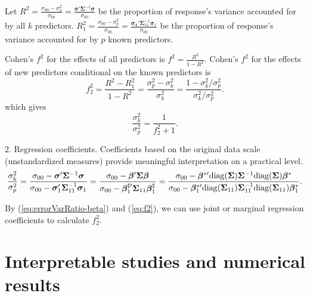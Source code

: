 \documentclass[11pt]{article}
\begin{document}
Let $R^2 = \frac{\sigma_{00}-\sigma^2_k}{\sigma_{00}} = \frac{\boldsymbol{\sigma}' \boldsymbol{\Sigma}^{-1} \boldsymbol{\sigma}}{\sigma_{00}}$ be the proportion of response's variance accounted for by all $k$ predictors. $R_1^2 = \frac{\sigma_{00}-\sigma^2_p}{\sigma_{00}} = \frac{\boldsymbol{\sigma_1}' \boldsymbol{\Sigma}_{11}^{-1} \boldsymbol{\sigma}_1}{\sigma_{00}}$ be the proportion of response's variance accounted for by $p$ known predictors.

Cohen's $f^2$ for the effects of all predictors is $f^2 = \frac{R^2}{1-R^2}$. Cohen's $f^2$ for the effects of new predictors conditional on the known predictors is 
\begin{equation}
\label{eq:f2}
f_2^2 = \frac{R^2 - R_1^2}{1- R^2} = \frac{\sigma_p^2 - \sigma_k^2}{\sigma_k^2} = \frac{1 - \sigma_k^2/\sigma_p^2}{\sigma_k^2/\sigma_p^2}.
\end{equation}
which gives 
\begin{equation}
\label{eq:errorVarRatio-f2}
\frac{\sigma_k^2}{\sigma_p^2}=\frac{1}{f_2^2 + 1}.
\end{equation}

2. Regression coefficients. Coefficients based on the original data scale (unstandardized measures) provide meaningful interpretation on a practical level. 
\begin{equation}
\label{eq:errorVarRatio-beta}
\frac{\sigma_k^2}{\sigma_p^2}
=\frac{\sigma_{00} - \boldsymbol{\sigma}' \boldsymbol{\Sigma}^{-1} \boldsymbol{\sigma}}{\sigma_{00} - \boldsymbol{\sigma}_1' \boldsymbol{\Sigma}_{11}^{-1} \boldsymbol{\sigma}_1}
=\frac{\sigma_{00} - \boldsymbol{\beta}' \boldsymbol{\Sigma} \boldsymbol{\beta}}{\sigma_{00} - \boldsymbol{\beta}_1^{\sharp\prime} \boldsymbol{\Sigma}_{11} \boldsymbol{\beta}_1^\sharp}
=\frac{
\sigma_{00} - \boldsymbol{\beta}^{*\prime} {\rm diag}(\boldsymbol{\Sigma}) \boldsymbol{\Sigma}^{-1} {\rm diag}(\boldsymbol{\Sigma})\boldsymbol{\beta}^*
}{
\sigma_{00} - \boldsymbol{\beta}_1^{*\prime} {\rm diag}(\boldsymbol{\Sigma}_{11})\boldsymbol{\Sigma}_{11}^{-1} {\rm diag}(\boldsymbol{\Sigma}_{11})\boldsymbol{\beta}_1^*
}.
\end{equation}

By (\ref{eq:errorVarRatio-beta}) and (\ref{eq:f2}), we can use joint or marginal regression coefficients to calculate $f_2^2$. 


\section{Interpretable studies and numerical results}
\end{document}
